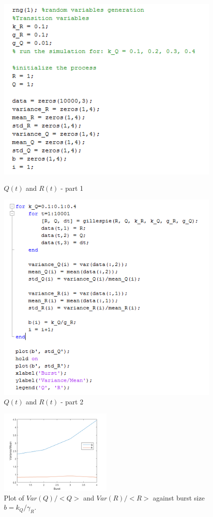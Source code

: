 \documentclass[a4paper]{article}
\begin{document}
\begin{figure}[ht]
\centering
\begin{minipage}[b]{0.48\textwidth}
\includegraphics[width=\textwidth]{code_part1_q2_10.PNG}
\caption{$Q(t)$ and $R(t)$ - part 1}
\label{fig:code_10 part1}
\end{minipage}
\quad
\begin{minipage}[b]{0.42\textwidth}
\includegraphics[width=\textwidth]{code_part2_q2_10.PNG}
\caption{$Q(t)$ and $R(t)$ - part 2}
\label{fig:code_10 part2}
\end{minipage}
\end{figure}

\begin{figure}
\centering
\includegraphics[width=0.5\textwidth]{q2_10.png}
\caption{\label{fig:q2_10} Plot of $Var(Q)/<Q>$ and $Var(R)/<R>$ against burst size \(b = k_Q/\gamma_R\).} 
\end{figure}
\end{document}
